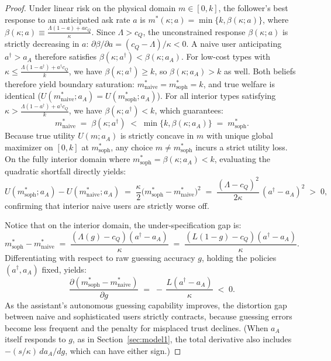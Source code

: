 \documentclass[11pt]{article}
\begin{document}
\begin{proof}
Under linear risk on the physical domain $m \in [0, k]$, the follower's best response to an anticipated ask rate $a$ is $m^*(\kappa;a) = \min\{k, \beta(\kappa;a)\}$, where $\beta(\kappa;a) \equiv \frac{\Lambda(1-a) + a c_Q}{\kappa}$. Since $\Lambda > c_Q$, the unconstrained response $\beta(\kappa;a)$ is strictly decreasing in $a$: $\partial\beta/\partial a = (c_Q - \Lambda)/\kappa < 0$. A naive user anticipating $a^\dagger > a_A$ therefore satisfies $\beta(\kappa;a^\dagger) < \beta(\kappa;a_A)$.
For low-cost types with $\kappa \le \frac{\Lambda(1-a^\dagger) + a^\dagger c_Q}{k}$, we have $\beta(\kappa;a^\dagger) \ge k$, so $\beta(\kappa;a_A) > k$ as well. Both beliefs therefore yield boundary saturation: $m^*_{\text{naive}} = m^*_{\text{soph}} = k$, and true welfare is identical ($U(m^*_{\text{naive}};a_A) = U(m^*_{\text{soph}};a_A)$).
For all interior types satisfying $\kappa > \frac{\Lambda(1-a^\dagger) + a^\dagger c_Q}{k}$, we have $\beta(\kappa;a^\dagger) < k$, which guarantees:
\[
m^*_{\text{naive}} \;=\; \beta(\kappa;a^\dagger) \;<\; \min\{k, \beta(\kappa;a_A)\} \;=\; m^*_{\text{soph}}.
\]
Because true utility $U(m;a_A)$ is strictly concave in $m$ with unique global maximizer on $[0, k]$ at $m^*_{\text{soph}}$, any choice $m \ne m^*_{\text{soph}}$ incurs a strict utility loss. On the fully interior domain where $m^*_{\text{soph}} = \beta(\kappa;a_A) < k$, evaluating the quadratic shortfall directly yields:
\[
U(m^*_{\text{soph}};a_A) - U(m^*_{\text{naive}};a_A) \;=\; \frac{\kappa}{2}\big(m^*_{\text{soph}} - m^*_{\text{naive}}\big)^2 \;=\; \frac{(\Lambda - c_Q)^2}{2\kappa}\,(a^\dagger - a_A)^2 \;>\; 0,
\]
confirming that interior naive users are strictly worse off.

Notice that on the interior domain, the under-specification gap is:
\[
m^*_{\text{soph}} - m^*_{\text{naive}} \;=\; \frac{(\Lambda(g) - c_Q)(a^\dagger - a_A)}{\kappa} \;=\; \frac{(L(1-g) - c_Q)(a^\dagger - a_A)}{\kappa}.
\]
Differentiating with respect to raw guessing accuracy $g$, holding the policies $(a^\dagger, a_A)$ fixed, yields:
\[
\frac{\partial (m^*_{\text{soph}} - m^*_{\text{naive}})}{\partial g} \;=\; -\,\frac{L(a^\dagger - a_A)}{\kappa} \;<\; 0.
\]
As the assistant's autonomous guessing capability improves, the distortion gap between naive and sophisticated users strictly contracts, because guessing errors become less frequent and the penalty for misplaced trust declines. (When $a_A$ itself responds to $g$, as in Section~\ref{sec:model1}, the total derivative also includes $-(s/\kappa)\, da_A/dg$, which can have either sign.)
\end{proof}
\end{document}
